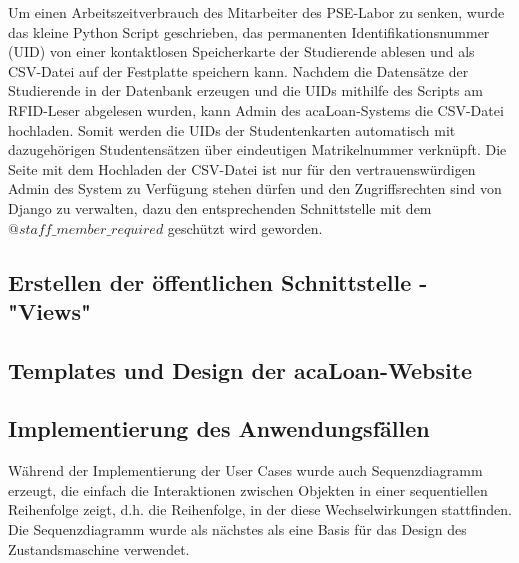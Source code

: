 Um einen  Arbeitszeitverbrauch des Mitarbeiter des PSE-Labor zu senken, wurde das kleine Python Script geschrieben, das permanenten Identifikationsnummer (UID) von einer kontaktlosen Speicherkarte der Studierende ablesen und als CSV-Datei auf der Festplatte speichern kann. Nachdem die Datensätze der Studierende in der Datenbank erzeugen und die UIDs mithilfe des Scripts am RFID-Leser abgelesen wurden, kann Admin des acaLoan-Systems die CSV-Datei hochladen. Somit werden die UIDs der Studentenkarten automatisch mit dazugehörigen Studentensätzen über eindeutigen Matrikelnummer verknüpft. Die Seite mit dem Hochladen der CSV-Datei ist nur für den vertrauenswürdigen Admin des System zu Verfügung stehen dürfen und den Zugriffsrechten sind von Django zu verwalten, dazu den entsprechenden Schnittstelle mit dem $@staff\_member\_required$ geschützt wird geworden.


\subsection{Erstellen der öffentlichen Schnittstelle - "Views"}
\label{sec:server:views}


\subsection{Templates und Design der acaLoan-Website}
\label{sec:server:design}

\subsection{Implementierung des Anwendungsfällen}
\label{sec:server:fsm}
Während der Implementierung der User Cases wurde auch Sequenzdiagramm erzeugt, die einfach die Interaktionen zwischen Objekten in einer sequentiellen Reihenfolge zeigt, d.h. die Reihenfolge, in der diese Wechselwirkungen stattfinden. Die Sequenzdiagramm wurde als nächstes als eine Basis für das Design des Zustandsmaschine verwendet.  

